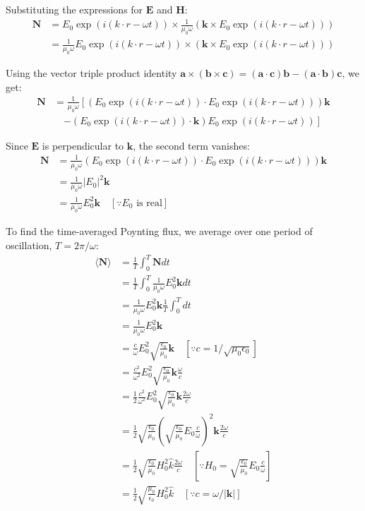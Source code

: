 \documentclass{article}
\begin{document}
Substituting the expressions for $\mathbf{E}$ and $\mathbf{H}$:
\begin{align*}
\mathbf{N} &= E_0 \exp(i (k \cdot r - \omega t)) \times \frac{1}{\mu_0 \omega} (\mathbf{k} \times E_0 \exp(i (k \cdot r - \omega t))) \\
&= \frac{1}{\mu_0 \omega} E_0 \exp(i (k \cdot r - \omega t)) \times (\mathbf{k} \times E_0 \exp(i (k \cdot r - \omega t))) 
\end{align*}

Using the vector triple product identity $\mathbf{a} \times (\mathbf{b} \times \mathbf{c}) = (\mathbf{a} \cdot \mathbf{c})\mathbf{b} - (\mathbf{a} \cdot \mathbf{b})\mathbf{c}$, we get:
\begin{align*}
\mathbf{N} &= \frac{1}{\mu_0 \omega}  \left[ (E_0 \exp(i (k \cdot r - \omega t)) \cdot E_0 \exp(i (k \cdot r - \omega t))) \mathbf{k} \right. \\ 
& \quad \left. - (E_0 \exp(i (k \cdot r - \omega t)) \cdot \mathbf{k}) E_0 \exp(i (k \cdot r - \omega t)) \right]
\end{align*}

Since $\mathbf{E}$ is perpendicular to $\mathbf{k}$, the second term vanishes:
\begin{align*}
\mathbf{N} &= \frac{1}{\mu_0 \omega} (E_0 \exp(i (k \cdot r - \omega t)) \cdot E_0 \exp(i (k \cdot r - \omega t))) \mathbf{k} \\
&= \frac{1}{\mu_0 \omega} |E_0|^2 \mathbf{k} \\
&= \frac{1}{\mu_0 \omega} E_0^2 \mathbf{k} \quad [\because E_0 \text{ is real}]
\end{align*}

To find the time-averaged Poynting flux, we average over one period of oscillation, $T = 2\pi/\omega$:
\begin{align*}
\langle \mathbf{N} \rangle &= \frac{1}{T} \int_0^T \mathbf{N} dt \\
&= \frac{1}{T} \int_0^T \frac{1}{\mu_0 \omega} E_0^2 \mathbf{k} dt \\
&= \frac{1}{\mu_0 \omega} E_0^2 \mathbf{k} \frac{1}{T} \int_0^T dt \\
&= \frac{1}{\mu_0 \omega} E_0^2 \mathbf{k} \\
&= \frac{c}{\omega} E_0^2 \sqrt{\frac{\epsilon_0}{\mu_0}} \mathbf{k} \quad [\because c = 1/\sqrt{\mu_0 \epsilon_0}] \\
&= \frac{c^2}{\omega^2} E_0^2 \sqrt{\frac{\epsilon_0}{\mu_0}} \mathbf{k} \frac{\omega}{c} \\
&= \frac{1}{2} \frac{c^2}{\omega^2} E_0^2 \sqrt{\frac{\epsilon_0}{\mu_0}} \mathbf{k} \frac{2\omega}{c} \\
&= \frac{1}{2} \sqrt{\frac{\epsilon_0}{\mu_0}} \left( \sqrt{\frac{\epsilon_0}{\mu_0}} E_0 \frac{c}{\omega} \right)^2 \mathbf{k} \frac{2\omega}{c} \\
&= \frac{1}{2} \sqrt{\frac{\epsilon_0}{\mu_0}} H_0^2 \hat{k} \frac{2\omega}{c} \quad [\because H_0 = \sqrt{\frac{\epsilon_0}{\mu_0}} E_0 \frac{c}{\omega}] \\
&= \frac{1}{2} \sqrt{\frac{\mu_0}{\epsilon_0}} H_0^2 \hat{k} \quad [\because c = \omega/|\mathbf{k}|]
\end{align*}
\end{document}
